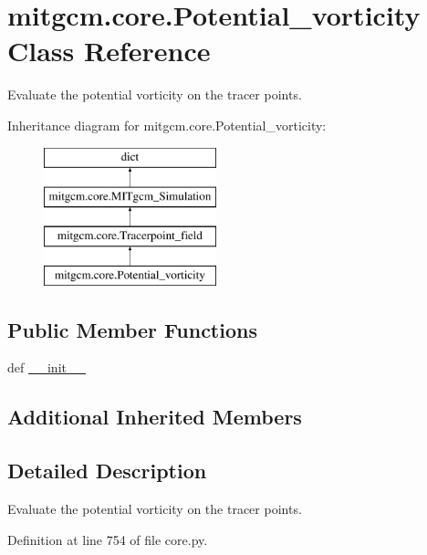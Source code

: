 \hypertarget{classmitgcm_1_1core_1_1Potential__vorticity}{\section{mitgcm.\+core.\+Potential\+\_\+vorticity Class Reference}
\label{classmitgcm_1_1core_1_1Potential__vorticity}
}


Evaluate the potential vorticity on the tracer points.  


Inheritance diagram for mitgcm.\+core.\+Potential\+\_\+vorticity\+:\begin{figure}[H]
\begin{center}
\leavevmode
\includegraphics[height=4.000000cm]{classmitgcm_1_1core_1_1Potential__vorticity}
\end{center}
\end{figure}
\subsection*{Public Member Functions}
\begin{DoxyCompactItemize}
\item 
def \hyperlink{classmitgcm_1_1core_1_1Potential__vorticity_aa5cd85f4c534241e18601d592c30b098}{\+\_\+\+\_\+init\+\_\+\+\_\+}
\end{DoxyCompactItemize}
\subsection*{Additional Inherited Members}


\subsection{Detailed Description}
Evaluate the potential vorticity on the tracer points. 



Definition at line 754 of file core.\+py.




